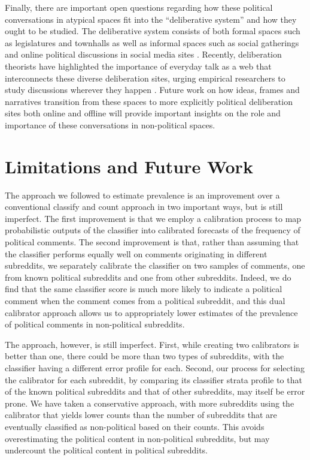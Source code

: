 \documentclass[letterpaper]{article} %
\begin{document}
Finally, there are important open questions regarding how these political conversations in atypical spaces fit into the  ``deliberative system'' and how they ought to be studied. The deliberative system consists of both formal spaces such as legislatures and townhalls as well as informal spaces such as social gatherings and online political discussions in social media sites \cite{parkinson2012deliberative}. Recently, deliberation  theorists have highlighted the importance of everyday talk as a web that interconnects these diverse deliberation sites, urging empirical researchers to study discussions wherever they happen \cite{mansbridge1999everyday,conover2018taking}. Future work on how ideas, frames and narratives transition from these spaces to more explicitly political deliberation sites both online and offline will provide important insights on the role and importance of these conversations in non-political spaces.



\section{Limitations and Future Work}

The approach we followed to estimate prevalence is an improvement over a conventional classify and count approach in two important ways, but is still imperfect. The first improvement is that we employ a calibration process to map probabilistic outputs of the classifier into calibrated forecasts of the frequency of political comments. The second improvement is that, rather than assuming that the classifier performs equally well on comments originating in different subreddits, we separately calibrate the classifier on two samples of comments, one from known political subreddits and one from other subreddits. Indeed, we do find that the same classifier score is much more likely to indicate a political comment when the comment comes from a political subreddit, and this dual calibrator approach allows us to appropriately lower estimates of the prevalence of political comments in non-political subreddits.

The approach, however, is still imperfect. First, while creating two calibrators is better than one, there could be more than two types of subreddits, with the classifier having a different error profile for each. Second, our process for selecting the calibrator for each subreddit, by comparing its classifier strata profile to that of the known political subreddits and that of other subreddits, may itself be error prone. We have taken a conservative approach, with more subreddits using the calibrator that yields lower counts than the number of subreddits that are eventually classified as non-political based on their counts. This avoids overestimating the political content in non-political subreddits, but may undercount the political content in political subreddits.
\end{document}
